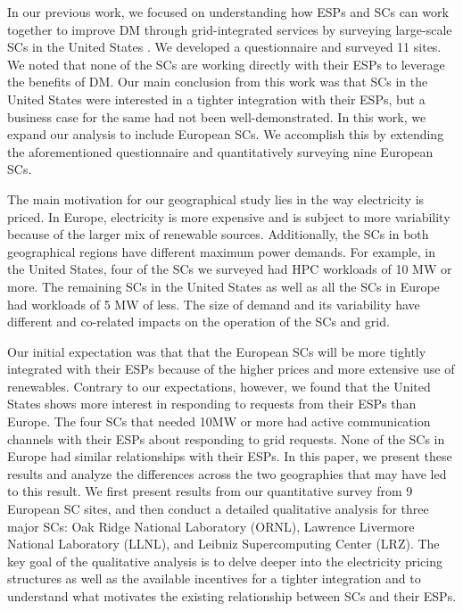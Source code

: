 In our previous work, we focused on understanding how ESPs and SCs can work together to improve DM through grid-integrated services by surveying large-scale SCs in the United States \cite{BatesESP}. We developed a questionnaire and surveyed 11 sites. We noted that none of the SCs are working directly with their ESPs to leverage the benefits of DM. Our main conclusion from this work was that SCs in the United States were interested in a tighter integration with their ESPs, but a business case for the same had not been well-demonstrated. In this work, we expand our analysis to include European SCs. We accomplish this by extending the aforementioned questionnaire and quantitatively surveying nine European SCs. 


The main motivation for our geographical study lies in the way electricity is priced. In Europe, electricity is more expensive and is subject to more variability because of the larger mix of renewable sources. Additionally, the SCs in both geographical regions have different maximum power demands. For example, in the United States, four of the SCs we surveyed had HPC workloads of 10 MW or more. The remaining SCs in the United States as well as all the SCs in Europe had workloads of 5 MW of less. The size of demand and its variability have different and co-related impacts on the operation of the SCs and grid. 

Our initial expectation was that that the European SCs will be more tightly integrated with their ESPs because of the higher prices and more extensive use of renewables.  Contrary to our expectations, however, we found that the United States shows more interest in responding to requests from their ESPs than Europe. The four SCs that needed 10MW or more had active communication channels with their ESPs about responding to grid requests.  None of the SCs in Europe had similar relationships with their ESPs. In this paper, we present these results and analyze the differences across the two geographies that may have led to this result. We first present results from our quantitative survey from 9 European SC sites, and then conduct a detailed qualitative analysis for three major SCs: Oak Ridge National Laboratory (ORNL), Lawrence Livermore National Laboratory (LLNL), and Leibniz Supercomputing Center (LRZ). The key goal of the qualitative analysis is to delve deeper into the electricity pricing structures as well as the available incentives for a tighter integration and to understand what motivates the existing relationship between SCs and their ESPs. 


